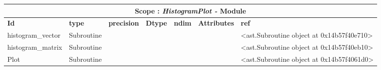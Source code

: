\documentclass{report}
\begin{document}
\begin{center}
\begin{longtable}{|p{3.5cm}|p{1.5cm}|p{1.5cm}|p{1.5cm}|p{1cm}|p{2cm}|p{4cm}| }
\hline
\multicolumn{7}{|c|}{\textbf{Scope : \qquad}  \textbf{\textit{HistogramPlot - }Module}}\\ 
\hline
\textbf{Id} & \textbf{type} & \textbf{precision} & \textbf{Dtype} & \textbf{ndim} & \textbf{Attributes} & \textbf{ref} \\\hline

histogram\_vector & Subroutine &  &  &  &  & <ast.Subroutine object at 0x14b57f40e710> \\\hline

histogram\_matrix & Subroutine &  &  &  &  & <ast.Subroutine object at 0x14b57f40eb10> \\\hline

Plot & Subroutine &  &  &  &  & <ast.Subroutine object at 0x14b57f4061d0> \\\hline

\end{longtable}
\end{center}

 \vspace{1cm}
\end{document}
